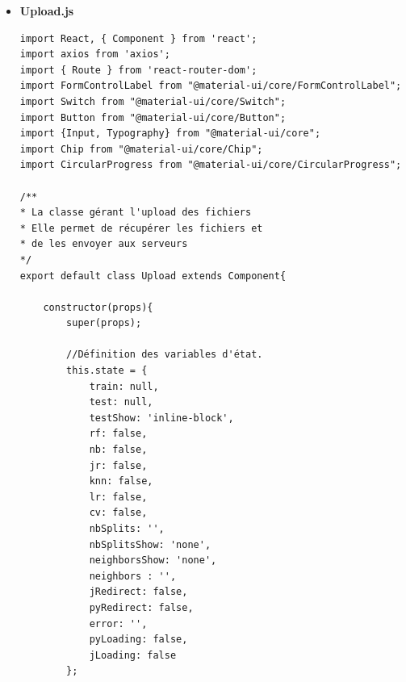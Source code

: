 \documentclass[a4paper,11pt]{article}
\begin{document}
\begin{itemize}
\begin{itemize}
\begin{verbatim}
    render() {
        return (
            <div>
                <div style={ style } className="homeDiv"></div>
                <div style={{ color: 'white', position: 'relative', top: 150, left: 150}} className="h2 col-md-6">
                    <Typography style={{color: 'white'}} variant="display1">Welcome to our Machine Learning Platform,</Typography>
                </div>
                <div style={{ color: 'white', position: 'relative', top: 170, left: 150}} className="h2 col-md-6">
                    <Typography style={{color: 'white'}} variant="display1">upload your files and see the magic worked
                        with our algorithms.</Typography>
                </div>
                <div style={{ position: 'relative', top: 190, left: 150}} className="col-md-3">
                    <Link to="/upload" style={{textDecoration: 'none'}}>
                        <Button variant="contained" color="secondary">
                            Get started
                        </Button>
                    </Link>
                </div>
            </div>
        );
    }

}

const style = {
    position: 'absolute',
    height: "100%",
    width: "100%",
    backgroundImage: `url(${img})`,
}
\end{verbatim}
\item \textbf{Upload.js}
\begin{verbatim}
import React, { Component } from 'react';
import axios from 'axios';
import { Route } from 'react-router-dom';
import FormControlLabel from "@material-ui/core/FormControlLabel";
import Switch from "@material-ui/core/Switch";
import Button from "@material-ui/core/Button";
import {Input, Typography} from "@material-ui/core";
import Chip from "@material-ui/core/Chip";
import CircularProgress from "@material-ui/core/CircularProgress";

/**
* La classe gérant l'upload des fichiers
* Elle permet de récupérer les fichiers et
* de les envoyer aux serveurs
*/
export default class Upload extends Component{

    constructor(props){
        super(props);

        //Définition des variables d'état.
        this.state = {
            train: null,
            test: null,
            testShow: 'inline-block',
            rf: false,
            nb: false,
            jr: false,
            knn: false,
            lr: false,
            cv: false,
            nbSplits: '',
            nbSplitsShow: 'none',
            neighborsShow: 'none',
            neighbors : '',
            jRedirect: false,
            pyRedirect: false,
            error: '',
            pyLoading: false,
            jLoading: false
        };


\end{verbatim}
\end{itemize}
\end{itemize}
\end{document}
